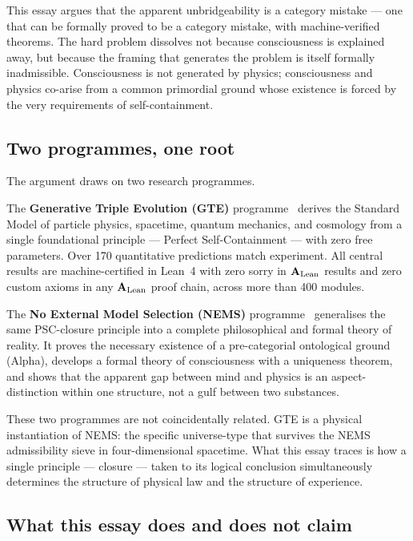 \documentclass[11pt]{article}
\theoremstyle{remark}
\newcommand{\CatAL}{\ensuremath{\textbf{A}_{\rm Lean}}}
\begin{document}
This essay argues that the apparent unbridgeability is a category mistake --- one that can
be formally proved to be a category mistake, with machine-verified theorems. The hard
problem dissolves not because consciousness is explained away, but because the framing
that generates the problem is itself formally inadmissible. Consciousness is not
generated by physics; consciousness and physics co-arise from a common primordial
ground whose existence is forced by the very requirements of self-containment.

\subsection{Two programmes, one root}

The argument draws on two research programmes.

The \textbf{Generative Triple Evolution (GTE)} programme~\cite{SpivackGTECompleteFramework}
derives the Standard Model of particle physics, spacetime, quantum mechanics, and
cosmology from a single foundational principle --- Perfect Self-Containment --- with
zero free parameters. Over 170 quantitative predictions match experiment. All central
results are machine-certified in Lean~4 with zero sorry in \CatAL{} results and zero
custom axioms in any \CatAL{} proof chain, across more than 400 modules.

The \textbf{No External Model Selection (NEMS)} programme~\cite{SpivackNEMSHub}
generalises the same PSC-closure principle into a complete philosophical and formal
theory of reality. It proves the necessary existence of a pre-categorial ontological
ground (Alpha), develops a formal theory of consciousness with a uniqueness theorem,
and shows that the apparent gap between mind and physics is an aspect-distinction
within one structure, not a gulf between two substances.

These two programmes are not coincidentally related. GTE is a physical instantiation
of NEMS: the specific universe-type that survives the NEMS admissibility sieve in
four-dimensional spacetime. What this essay traces is how a single principle --- closure
--- taken to its logical conclusion simultaneously determines the structure of physical
law and the structure of experience.

\subsection{What this essay does and does not claim}
\end{document}

